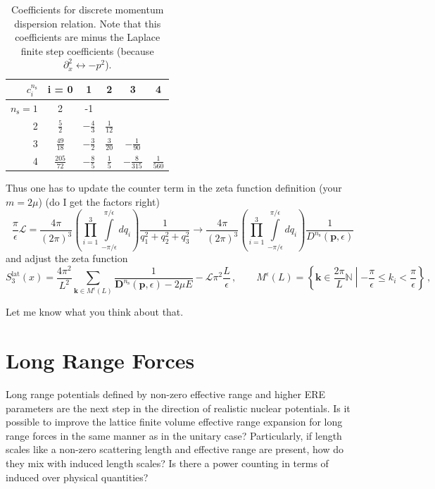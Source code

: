 \documentclass[
    aps,
    prl,
    showkeys,
    nofootinbib,
    floatfix
]{revtex4-1}
\renewcommand{\vec}[1]{\boldsymbol{#1}}
\begin{document}
\begin{table}[htb]
\centering
\begin{tabular}{r | ccccc}
$ c_{i}^{n_{\mathrm{s}}}$ & i = 0 & 1 & 2 & 3 & 4 \\ \hline
$n_{\mathrm{s}} = 1$ & 2 & -1 \\
2 & $\frac{5}{2}$ & $-\frac{4}{3}$ & $\frac{1}{12}$ \\
3 & $\frac{49}{18}$ & $-\frac{3}{2}$ & $\frac{3}{20}$ & $-\frac{1}{90}$ \\
4 & $\frac{205}{72}$ & $-\frac{8}{5}$ & $\frac{1}{5}$  & $-\frac{8}{315}$ & $\frac{1}{560}$
\end{tabular}
\caption{\label{tab-dispersion-coeff}Coefficients for discrete momentum dispersion relation.
    Note that this coefficients are minus the Laplace finite step coefficients (because $\partial_x^2 \leftrightarrow - p^2$).
}
\end{table}

Thus one has to update the counter term in the zeta function definition (your $m = 2\mu$) (do I get the factors right)
\begin{equation}
    \frac{\pi}{\epsilon}
    \mathcal L
    =
    \frac{4 \pi}{(2\pi)^3}
    \left(
    \prod \limits_{i=1}^3
    \int\limits_{-\pi /\epsilon}^{\pi / \epsilon}
    d q_i
    \right)
    \frac{1}{q_1^2 + q_2^2 + q_3^2}
    \to
    \frac{4 \pi}{(2\pi)^3}
    \left(
    \prod \limits_{i=1}^3
    \int\limits_{-\pi / \epsilon}^{\pi / \epsilon}
    d q_i
    \right)
    \frac{1}{D^{n_{\mathrm{s}}}(\vec p, \epsilon)}
\end{equation}
and adjust the zeta function
\begin{equation}
    S_3^{\mathrm{lat}}(x) = \frac{4 \pi^2}{L^2} \sum\limits_{\vec k \in M^\epsilon(L)} \frac{1}{\vec D^{n_{\mathrm{s}}}(\vec p, \epsilon) - 2 \mu E} - \mathcal L \pi^2 \frac{L}{\epsilon}
    \, , \qquad
    M^\epsilon(L) = \left\{ \vec k \in \frac{2 \pi}{L} \mathbb N \middle\vert - \frac{\pi}{\epsilon} \leq k_i < \frac{\pi}{\epsilon} \right\}
    \, ,
\end{equation}

Let me know what you think about that.

\newpage
\section{Long Range Forces}
Long range potentials defined by non-zero effective range and higher ERE parameters are the next step in the direction of realistic nuclear potentials.
Is it possible to improve the lattice finite volume effective range expansion for long range forces in the same manner as in the unitary case?
Particularly, if length scales like a non-zero scattering length and effective range are present, how do they mix with induced length scales?
Is there a power counting in terms of induced over physical quantities?
\end{document}
